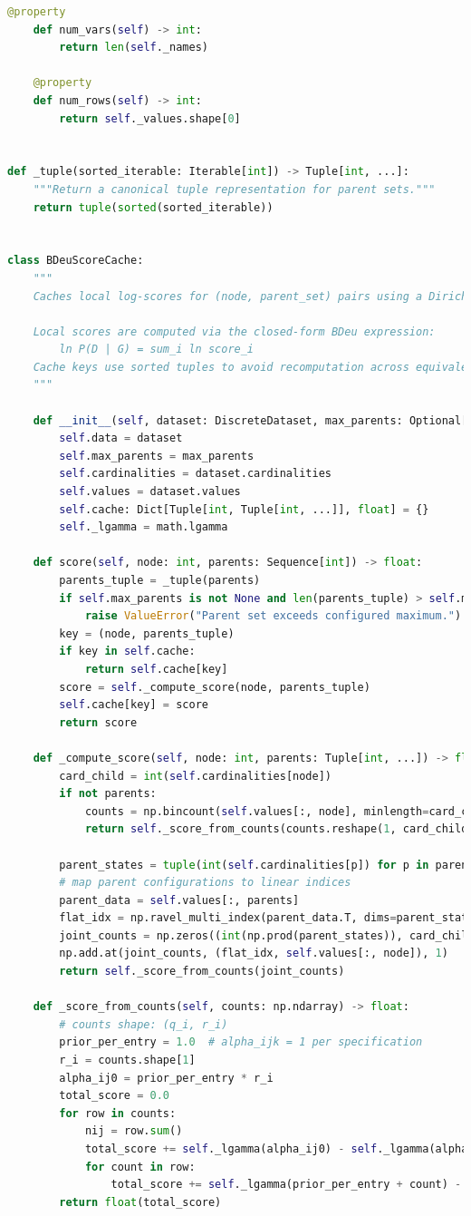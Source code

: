 \documentclass[twoside,11pt]{article}
\begin{document}
\begin{algorithm}
\begin{lstlisting}[language=Python]
    @property
    def num_vars(self) -> int:
        return len(self._names)

    @property
    def num_rows(self) -> int:
        return self._values.shape[0]


def _tuple(sorted_iterable: Iterable[int]) -> Tuple[int, ...]:
    """Return a canonical tuple representation for parent sets."""
    return tuple(sorted(sorted_iterable))


class BDeuScoreCache:
    """
    Caches local log-scores for (node, parent_set) pairs using a Dirichlet(1) prior.

    Local scores are computed via the closed-form BDeu expression:
        ln P(D | G) = sum_i ln score_i
    Cache keys use sorted tuples to avoid recomputation across equivalent sets.
    """

    def __init__(self, dataset: DiscreteDataset, max_parents: Optional[int] = None):
        self.data = dataset
        self.max_parents = max_parents
        self.cardinalities = dataset.cardinalities
        self.values = dataset.values
        self.cache: Dict[Tuple[int, Tuple[int, ...]], float] = {}
        self._lgamma = math.lgamma

    def score(self, node: int, parents: Sequence[int]) -> float:
        parents_tuple = _tuple(parents)
        if self.max_parents is not None and len(parents_tuple) > self.max_parents:
            raise ValueError("Parent set exceeds configured maximum.")
        key = (node, parents_tuple)
        if key in self.cache:
            return self.cache[key]
        score = self._compute_score(node, parents_tuple)
        self.cache[key] = score
        return score

    def _compute_score(self, node: int, parents: Tuple[int, ...]) -> float:
        card_child = int(self.cardinalities[node])
        if not parents:
            counts = np.bincount(self.values[:, node], minlength=card_child)
            return self._score_from_counts(counts.reshape(1, card_child))

        parent_states = tuple(int(self.cardinalities[p]) for p in parents)
        # map parent configurations to linear indices
        parent_data = self.values[:, parents]
        flat_idx = np.ravel_multi_index(parent_data.T, dims=parent_states)
        joint_counts = np.zeros((int(np.prod(parent_states)), card_child), dtype=np.int32)
        np.add.at(joint_counts, (flat_idx, self.values[:, node]), 1)
        return self._score_from_counts(joint_counts)

    def _score_from_counts(self, counts: np.ndarray) -> float:
        # counts shape: (q_i, r_i)
        prior_per_entry = 1.0  # alpha_ijk = 1 per specification
        r_i = counts.shape[1]
        alpha_ij0 = prior_per_entry * r_i
        total_score = 0.0
        for row in counts:
            nij = row.sum()
            total_score += self._lgamma(alpha_ij0) - self._lgamma(alpha_ij0 + nij)
            for count in row:
                total_score += self._lgamma(prior_per_entry + count) - self._lgamma(prior_per_entry)
        return float(total_score)



\end{lstlisting}
\end{algorithm}
\end{document}
